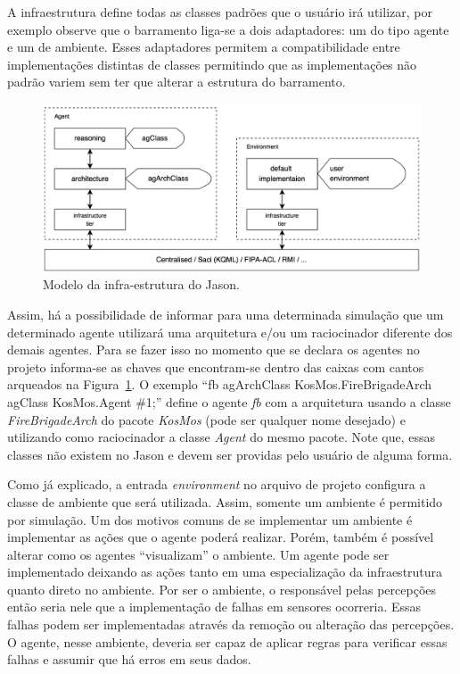 A infraestrutura define todas as classes padrões que o usuário irá utilizar,
por exemplo observe que o barramento liga-se a dois adaptadores: um do tipo
agente e um de ambiente. Esses adaptadores permitem a compatibilidade entre
implementações distintas de classes permitindo que as implementações não
padrão variem sem ter que alterar a estrutura do barramento.

\begin{figure}
               \begin{center}
               \includegraphics[width=140mm]{figuras/infra.png} 
                \end{center}
                \caption{Modelo da infra-estrutura do Jason.}
                \label{fig-jason-infra-1}
\end{figure}

Assim, há a possibilidade de informar para uma determinada simulação que um
determinado agente utilizará uma arquitetura e/ou um raciocinador diferente
dos demais agentes. Para se fazer isso no momento que se declara os agentes
no projeto informa-se as chaves que encontram-se dentro das caixas com
cantos arqueados na Figura~\ref{fig-jason-infra-1}. O exemplo
``fb agArchClass KosMos.FireBrigadeArch agClass KosMos.Agent \#1;'' define
o agente \emph{fb} com a arquitetura usando a classe \emph{FireBrigadeArch}
do pacote \emph{KosMos} (pode ser qualquer nome desejado) e utilizando como
raciocinador a classe \emph{Agent} do mesmo pacote. Note que, essas classes
não existem no Jason e devem ser providas pelo usuário de alguma forma.

Como já explicado, a entrada \emph{environment} no arquivo de projeto
configura a classe de ambiente que será utilizada. Assim, somente um ambiente
é permitido por simulação. Um dos motivos comuns de se implementar um
ambiente é implementar as ações que o agente poderá realizar. Porém,
também é possível alterar como os agentes ``visualizam'' o ambiente. Um
agente pode ser implementado deixando as ações tanto em uma
especialização da infraestrutura quanto direto no ambiente. Por ser o
ambiente, o responsável pelas percepções então seria nele que a implementação
de falhas em sensores ocorreria. Essas falhas podem ser implementadas através
da remoção ou alteração das percepções. O agente, nesse ambiente, deveria ser
capaz de aplicar regras para verificar essas falhas e assumir que há erros em
seus dados.

